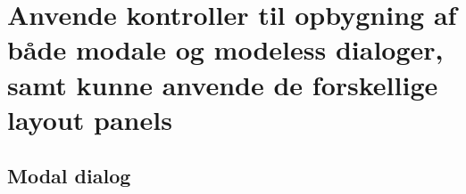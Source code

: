 \section{Anvende kontroller til opbygning af både modale og modeless dialoger, samt kunne anvende de forskellige layout panels}\label{sec:spm3}


\subsection{Modal dialog}